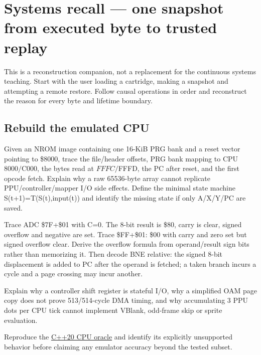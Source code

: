 \hypertarget{appendix-11f73b337e37}{}\label{referencestart:appendix-11f73b337e37}
\section{Systems recall --- one snapshot from executed byte to trusted replay}\label{appendix-11f73b337e37-systems-recall-one-snapshot-from-executed-byte-to-trusted-replay}

\hypertarget{appendix-11f73b337e37-systems-recall-one-snapshot-from-executed-byte-to-trusted-replay}{}

This is a reconstruction companion, not a replacement for {the continuous systems teaching}. Start with the user loading a cartridge, making a snapshot and attempting a remote restore. Follow causal operations in order and reconstruct the reason for every byte and lifetime boundary.

\subsection{Rebuild the emulated CPU}\label{appendix-11f73b337e37-rebuild-the-emulated-cpu}

\hypertarget{appendix-11f73b337e37-rebuild-the-emulated-cpu}{}

Given an NROM image containing one 16-KiB PRG bank and a reset vector pointing to \$8000, trace the file/header offsets, PRG bank mapping to CPU \(8000/\)C000, the bytes read at \(FFFC/\)FFFD, the PC after reset, and the first opcode fetch. Explain why a raw 65536-byte array cannot replicate PPU/controller/mapper I/O side effects. Define the minimal state machine S(t+1)=T(S(t),input(t)) and identify the missing state if only A/X/Y/PC are saved.

Trace ADC \$7F+\$01 with C=0. The 8-bit result is \$80, carry is clear, signed overflow and negative are set. Trace \$FF+\$01: \$00 with carry and zero set but signed overflow clear. Derive the overflow formula from operand/result sign bits rather than memorizing it. Then decode BNE relative: the signed 8-bit displacement is added to PC after the operand is fetched; a taken branch incurs a cycle and a page crossing may incur another.

Explain why a controller shift register is stateful I/O, why a simplified OAM page copy does not prove 513/514-cycle DMA timing, and why accumulating 3 PPU dots per CPU tick cannot implement VBlank, odd-frame skip or sprite evaluation.

Reproduce the \hyperref[source-file-552a9e2296dc984412c8f06d]{C++20 CPU oracle} and identify its explicitly unsupported behavior before claiming any emulator accuracy beyond the tested subset.

